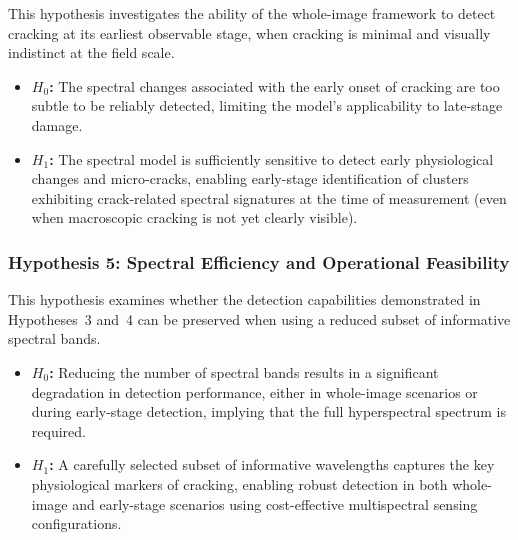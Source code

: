 \noindent
This hypothesis investigates the ability of the whole-image framework to detect cracking at its earliest observable stage, when cracking is minimal and visually indistinct at the field scale.

\begin{itemize}
    \item \textbf{$H_0$:} The spectral changes associated with the early onset of cracking are too subtle to be reliably detected, limiting the model's applicability to late-stage damage.
    \item \textbf{$H_1$:} The spectral model is sufficiently sensitive to detect early physiological changes and micro-cracks, enabling early-stage identification of clusters exhibiting crack-related spectral signatures at the time of measurement (even when macroscopic cracking is not yet clearly visible).
\end{itemize}

\subsubsection{Hypothesis 5: Spectral Efficiency and Operational Feasibility}
\label{hyp:spectral_efficiency}

\noindent
This hypothesis examines whether the detection capabilities demonstrated in Hypotheses~3 and~4 can be preserved when using a reduced subset of informative spectral bands.

\begin{itemize}
    \item \textbf{$H_0$:} Reducing the number of spectral bands results in a significant degradation in detection performance, either in whole-image scenarios or during early-stage detection, implying that the full hyperspectral spectrum is required.
    \item \textbf{$H_1$:} A carefully selected subset of informative wavelengths captures the key physiological markers of cracking, enabling robust detection in both whole-image and early-stage scenarios using cost-effective multispectral sensing configurations.
\end{itemize}